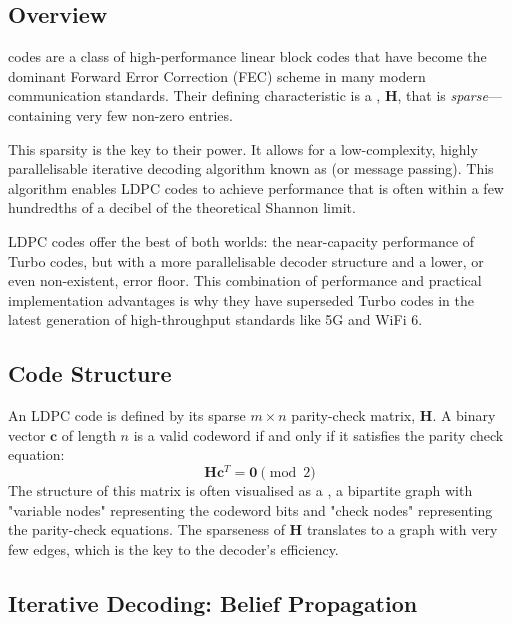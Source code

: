 \subsection{Overview}

 codes are a class of high-performance linear block codes that have become the dominant Forward Error Correction (FEC) scheme in many modern communication standards. Their defining characteristic is a , $\mathbf{H}$, that is \emph{sparse}—containing very few non-zero entries.

This sparsity is the key to their power. It allows for a low-complexity, highly parallelisable iterative decoding algorithm known as  (or message passing). This algorithm enables LDPC codes to achieve performance that is often within a few hundredths of a decibel of the theoretical Shannon limit.

\begin{keyconcept}
    LDPC codes offer the best of both worlds: the near-capacity performance of Turbo codes, but with a more parallelisable decoder structure and a lower, or even non-existent, error floor. This combination of performance and practical implementation advantages is why they have superseded Turbo codes in the latest generation of high-throughput standards like 5G and WiFi 6.
\end{keyconcept}


\subsection{Code Structure}

An LDPC code is defined by its sparse $m \times n$ parity-check matrix, $\mathbf{H}$. A binary vector $\mathbf{c}$ of length $n$ is a valid codeword if and only if it satisfies the parity check equation:
\begin{equation}
    \mathbf{H}\mathbf{c}^T = \mathbf{0} \pmod 2
\end{equation}
The structure of this matrix is often visualised as a , a bipartite graph with "variable nodes" representing the codeword bits and "check nodes" representing the parity-check equations. The sparseness of $\mathbf{H}$ translates to a graph with very few edges, which is the key to the decoder's efficiency.


\subsection{Iterative Decoding: Belief Propagation}

